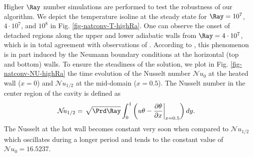 Higher $\Ray$ number simulations are performed to test the robustness of our algorithm.
We depict the temperature isoline at the steady state for $\Ray = 10^7$, $4 \cdot 10^7$, and $10^8$ in Fig. \ref{fig-natconv-T-highRa}.
One can observe the onset of detached regions along the upper and lower adiabatic walls from $\Ray = 4 \cdot 10^7$, which is in total agreement with observations of \cite{le1985computation}.
According to \cite{le1985computation}, this phenomenon is in part induced by the Neumann boundary conditions at the horizontal (top and bottom) walls.
To ensure the steadiness of the solution, we plot in Fig. \ref{fig-natconv-NU-highRa} the time evolution of the Nusselt number $\mathcal{N}\!u_0$ at the heated wall ($x=0$) and $\mathcal{N}\!u_{1/2}$ at the mid-domain ($x=0.5$).
The Nusselt number in the center region of the cavity is defined as
\begin{equation}
	\mathcal{N}\!u_{1/2} =  \left.  \sqrt{\Prd \Ray} \int_0^1 \left( u \theta - \frac{\partial \theta}{\partial x} \right |_{x=0.5} \right) dy.
\end{equation}
The Nusselt at the hot wall becomes constant very soon when compared to $\mathcal{N}\!u_{1/2}$ which oscillates during a longer period and tends to the constant value of $\mathcal{N}\!u_{0} = 16.5237$.


